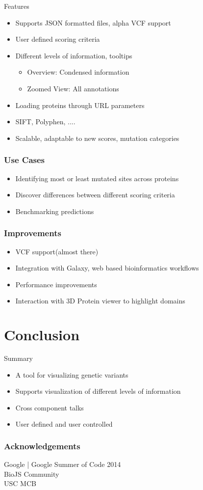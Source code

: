 \documentclass[10pt, compress]{beamer}
\renewcommand{\(}{\begin{columns}}
\renewcommand{\)}{\end{columns}}
\newcommand{\<}[1]{\begin{column}{#1}}
\renewcommand{\>}{\end{column}}
\begin{document}
\begin{frame}{Features}
\begin{itemize}[<+- | alert@+>]
\item Supports JSON formatted files, alpha VCF support
\item User defined scoring criteria
\item Different levels of information, tooltips
\begin{itemize}
\item Overview: Condensed information
\item Zoomed View: All annotations 
\end{itemize}
\item Loading proteins through URL parameters
\item SIFT, Polyphen, ....
\item Scalable, adaptable to new scores, mutation categories

\end{itemize}
\end{frame}

\begin{frame}
\frametitle{Use Cases}
\begin{itemize}[<+- | alert@+>]
\item Identifying most or least mutated sites across proteins
\item Discover differences between different scoring criteria
\item Benchmarking predictions
\end{itemize}

\end{frame}

\begin{frame}
\frametitle{Improvements}
\begin{itemize}[<+- | alert@+>]
\item VCF support(almost there)
\item Integration with Galaxy, web based bioinformatics workflows
\item Performance improvements
\item Interaction with 3D Protein viewer to highlight domains
\end{itemize}
\end{frame}

\section{Conclusion}

\begin{frame}{Summary}
\begin{itemize}
\item A tool for visualizing genetic variants
\item Supports visualization of different levels of information
\item Cross component talks
\item User defined and user controlled

\end{itemize}

\end{frame}

\begin{frame}
\frametitle{Acknowledgements}
Google | Google Summer of Code 2014\\
BioJS Community \\
USC MCB
\end{frame}

\end{document}
